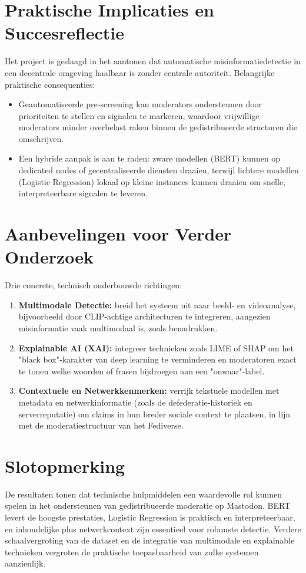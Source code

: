 \section{Praktische Implicaties en Succesreflectie}
Het project is geslaagd in het aantonen dat automatische misinformatiedetectie in een decentrale omgeving haalbaar is zonder centrale autoriteit. Belangrijke praktische consequenties:
\begin{itemize}
  \item Geautomatiseerde pre‑screening kan moderators ondersteunen door prioriteiten te stellen en signalen te markeren, waardoor vrijwillige moderators minder overbelast raken binnen de gedistribueerde structuren die \textcite{Zia2025} omschrijven.
  \item Een hybride aanpak is aan te raden: zware modellen (BERT) kunnen op dedicated nodes of gecentraliseerde diensten draaien, terwijl lichtere modellen (Logistic Regression) lokaal op kleine instances kunnen draaien om snelle, interpreteerbare signalen te leveren.
\end{itemize}

\section{Aanbevelingen voor Verder Onderzoek}
Drie concrete, technisch onderbouwde richtingen:
\begin{enumerate}
  \item \textbf{Multimodale Detectie:} breid het systeem uit naar beeld‑ en videoanalyse, bijvoorbeeld door CLIP‑achtige architecturen te integreren, aangezien misinformatie vaak multimodaal is, zoals \textcite{zhou2020similarity} benadrukken.
  \item \textbf{Explainable AI (XAI):} integreer technieken zoals LIME of SHAP om het "black box"‑karakter van deep learning te verminderen en moderatoren exact te tonen welke woorden of frasen bijdroegen aan een "onwaar"‑label.
  \item \textbf{Contextuele en Netwerkkenmerken:} verrijk tekstuele modellen met metadata en netwerkinformatie (zoals de defederatie‑historiek en serverreputatie) om claims in hun breder sociale context te plaatsen, in lijn met de moderatiestructuur van het Fediverse.
\end{enumerate}

\section{Slotopmerking}
De resultaten tonen dat technische hulpmiddelen een waardevolle rol kunnen spelen in het ondersteunen van gedistribueerde moderatie op Mastodon. BERT levert de hoogste prestaties, Logistic Regression is praktisch en interpreteerbaar, en inhoudelijke plus netwerkcontext zijn essentieel voor robuuste detectie. Verdere schaalvergroting van de dataset en de integratie van multimodale en explainable technieken vergroten de praktische toepasbaarheid van zulke systemen aanzienlijk.